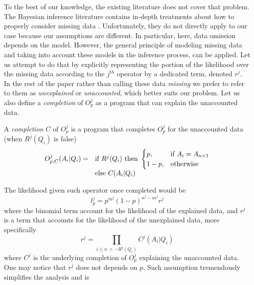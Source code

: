 \documentclass[runningheads]{llncs}
\begin{document}
To the best of our knowledge, the existing literature does not cover
that problem. The Bayesian inference literature contains in-depth
treatments about how to properly consider missing data
\cite{Schafer02missingdata}. Unfortunately, they do not directly apply
to our case because our assumptions are different. In particular,
here, data omission depends on the model. However, the general
principle of modeling missing data and taking into account these
models in the inference process, can be applied. Let us attempt to do
that by explicitly representing the portion of the likelihood over the
missing data according to the $j^{th}$ operator by a dedicated term,
denoted $r^j$. In the rest of the paper rather than calling these data
\emph{missing} we prefer to refer to them as \emph{unexplained} or
\emph{unaccounted}, which better suits our problem. Let us also define
a \emph{completion} of $O^j_p$ as a program that can explain the
unaccounted data.
\begin{definition}
  A \emph{completion} $C$ of $O^j_p$ is a program that completes
  $O^j_p$ for the unaccounted data (when $R^j(Q_i)$ is false)
  $$
  \begin{array}{@{}ll@{}}
    O^j_{p, C}(A_i|Q_i) = &
                            \text{if}\ R^j(Q_i)\ \text{then}\
                            \begin{cases}
                              p, & \text{if}\ A_i = A_{n+1} \\
                              1-p, & \text{otherwise}
                            \end{cases}\\
                          & \text{else}\ C(A_i|Q_i)
  \end{array}
  $$
\end{definition}
The likelihood given such operator once completed would be
\begin{equation}
  \label{new-lik}
l^j_p = p^{m^j}(1-p)^{n^j-m^j} r^j
\end{equation}
where the binomial term account for the likelihood of the explained
data, and $r^j$ is a term that accounts for the likelihood of the
unexplained data, more specifically
\begin{equation}
  r^j = \prod_{i \leq n\ \land\ \neg R^j(Q_i)} C^j(A_i|Q_i)
\end{equation}
where $C^j$ is the underlying completion of $O^j_p$ explaining the
unaccounted data. One may notice that $r^j$ does not depends on
$p$. Such assumption tremendously simplifies the analysis and is
\end{document}
